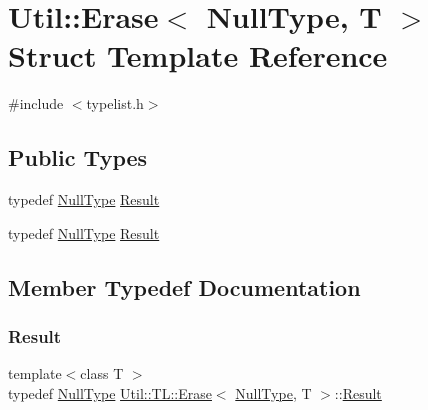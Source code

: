 \hypertarget{structUtil_1_1TL_1_1Erase_3_01NullType_00_01T_01_4}{}\section{Util\+:\+:Erase$<$ Null\+Type, T $>$ Struct Template Reference}
\label{structUtil_1_1TL_1_1Erase_3_01NullType_00_01T_01_4}


{\ttfamily \#include $<$typelist.\+h$>$}

\subsection*{Public Types}
\begin{DoxyCompactItemize}
\item 
typedef \mbox{\hyperlink{classUtil_1_1NullType}{Null\+Type}} \mbox{\hyperlink{structUtil_1_1TL_1_1Erase_3_01NullType_00_01T_01_4_a322fc628c66685b497fdb4d01f456b18}{Result}}
\item 
typedef \mbox{\hyperlink{classUtil_1_1NullType}{Null\+Type}} \mbox{\hyperlink{structUtil_1_1TL_1_1Erase_3_01NullType_00_01T_01_4_a322fc628c66685b497fdb4d01f456b18}{Result}}
\end{DoxyCompactItemize}


\subsection{Member Typedef Documentation}
\mbox{\label{structUtil_1_1TL_1_1Erase_3_01NullType_00_01T_01_4_a322fc628c66685b497fdb4d01f456b18}} 
\subsubsection{\texorpdfstring{Result}{Result}\hspace{0.1cm}{\footnotesize\ttfamily [1/2]}}
{\footnotesize\ttfamily template$<$class T $>$ \\
typedef \mbox{\hyperlink{classUtil_1_1NullType}{Null\+Type}} \mbox{\hyperlink{structUtil_1_1TL_1_1Erase}{Util\+::\+T\+L\+::\+Erase}}$<$ \mbox{\hyperlink{classUtil_1_1NullType}{Null\+Type}}, T $>$\+::\mbox{\hyperlink{structUtil_1_1TL_1_1Erase_3_01NullType_00_01T_01_4_a322fc628c66685b497fdb4d01f456b18}{Result}}}

